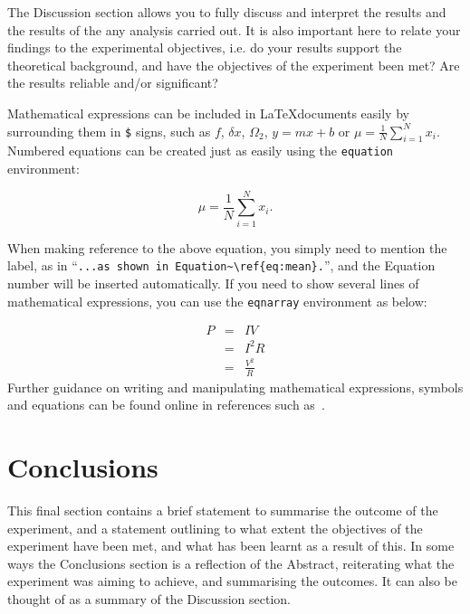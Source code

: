 \documentclass[11pt, a4paper]{article}
\begin{document}
The Discussion section allows you to fully discuss and interpret the results and the results of the any analysis carried out. It is also important here to relate your findings to the experimental objectives, i.e. do your results support the theoretical background, and have the objectives of the experiment been met? Are the results reliable and/or significant?

Mathematical expressions can be included in \LaTeX documents easily by surrounding them in \verb|$| signs, such as $f$, $\delta x$, $\Omega_2$, $y=mx+b$ or $\mu = \frac{1}{N}\sum_{i=1}^N x_i$. Numbered equations can be created just as easily using the \verb|equation| environment:

\begin{equation}
\mu = \frac{1}{N}\sum_{i=1}^N x_i.
\label{eq:mean}
\end{equation}

When making reference to the above equation, you simply need to mention the label, as in ``\verb|...as shown in Equation~\ref{eq:mean}.|'', and the Equation number will be inserted automatically. If you need to show several lines of mathematical expressions, you can use the \verb|eqnarray| environment as below:

\begin{eqnarray}
  P & = & I V             \\
    & = & I^2 R           \\
    & = & \frac{V^2}{R}
\label{eq:power}
\end{eqnarray}
Further guidance on writing and manipulating mathematical expressions, symbols and equations can be found online in references such as~\cite{ref:Maths}.

\section{Conclusions}

This final section contains a brief statement to summarise the outcome of the experiment, and a statement outlining to what extent the objectives of the experiment have been met, and what has been learnt as a result of this. In some ways the Conclusions section is a reflection of the Abstract, reiterating what the experiment was aiming to achieve, and summarising the outcomes. It can also be thought of as a summary of the Discussion section. 
\end{document}
